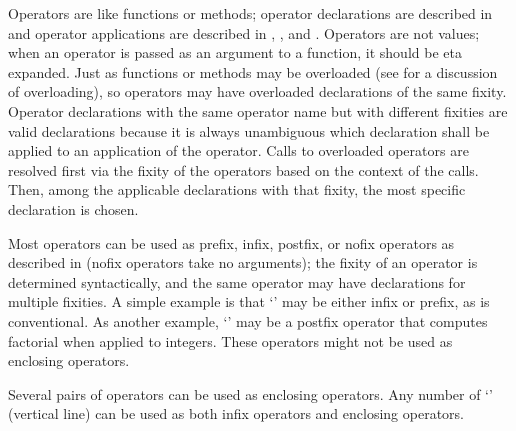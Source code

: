 %
%
%
%


Operators are like functions or methods; operator declarations are
described in  and operator applications are
described in , , and
.
Operators are not values; when an operator is passed as an argument to a
function, it should be eta expanded.
Just as functions or methods may be overloaded (see
 for a discussion of overloading),
so operators may have overloaded declarations of the same fixity.
Operator declarations with the same operator name but with different fixities
are valid declarations because it is always unambiguous which declaration
shall be applied to an application of the operator.
Calls to overloaded operators are resolved first via the
fixity of the operators based on the context of the calls.
Then, among the applicable declarations with that fixity,
the most specific declaration is chosen.

Most operators can be used as prefix, infix, postfix, or
nofix operators as described in 
(nofix operators take no arguments);
the fixity of an operator is determined syntactically,
and the same operator may have declarations for multiple fixities.
A simple example is that `\EXP{-}' may be either infix or prefix,
as is conventional.
As another example, `\EXP{!}' may be a
postfix operator that computes factorial when applied to integers.
These operators might not be used as enclosing operators.


Several pairs of operators can be used as enclosing operators.  Any number
of `\txt{|}' (vertical line) can be used as both infix operators and
enclosing operators.


